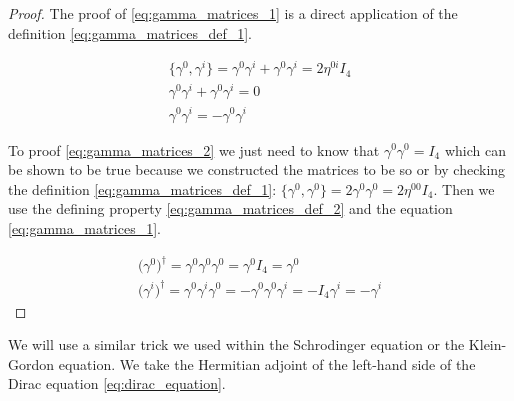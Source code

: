 \begin{proof}
    The proof of \ref{eq:gamma_matrices_1} is a direct application of the definition \ref{eq:gamma_matrices_def_1}.

    \begin{equation*}
        \begin{gathered}
            \{\gamma^{0}, \gamma^{i}\} = \gamma^{0} \gamma^{i} + \gamma^{0} \gamma^{i} = 2 \eta^{0 i} I_{4} \\
            \gamma^{0} \gamma^{i} + \gamma^{0} \gamma^{i} = 0 \\
            \gamma^{0} \gamma^{i} = - \gamma^{0} \gamma^{i} 
        \end{gathered}
    \end{equation*}

    To proof \ref{eq:gamma_matrices_2} we just need to know that $\gamma^{0} \gamma^{0} = I_{4}$ which can be shown to be true because we
    constructed the matrices to be so or by checking the definition \ref{eq:gamma_matrices_def_1}: 
    $\{\gamma^{0}, \gamma^{0}\} = 2 \gamma^{0} \gamma^{0} = 2 \eta^{00} I_{4}$. Then we use the defining property 
    \ref{eq:gamma_matrices_def_2} and the equation \ref{eq:gamma_matrices_1}.

    \begin{equation*}
        \begin{gathered}
            \big(\gamma^{0}\big)^{\dagger} = \gamma^{0} \gamma^{0} \gamma^{0} = \gamma^{0} I_{4} = \gamma^{0} \\
            \big(\gamma^{i}\big)^{\dagger} = \gamma^{0} \gamma^{i} \gamma^{0} = - \gamma^{0} \gamma^{0} \gamma^{i} = - I_{4} \gamma^{i} = - \gamma^{i}
        \end{gathered}
    \end{equation*}

\end{proof}

We will use a similar trick we used within the Schrodinger equation or the Klein-Gordon equation. We
take the Hermitian adjoint of the left-hand side of the Dirac equation \ref{eq:dirac_equation}.


